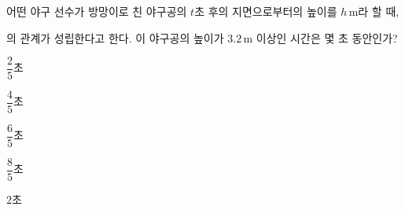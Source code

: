 \hspace*{2mm}\begin{minipage}[t]{\dimexpr\linewidth-2mm\relax}\vspace{0pt}
어떤 야구 선수가 방망이로 친 야구공의 $t$초 후의 지면으로부터의 높이를 $h\,\mathrm{m}$라 할 때,\par\smallskip{}\par\smallskip\noindent 의 관계가 성립한다고 한다. 이 야구공의 높이가 $3.2\,\mathrm{m}$ 이상인 시간은 몇 초 동안인가?
\begin{choices32}{\rule[-3ex]{0pt}{8ex}$\dfrac{2}{5}$초}{\rule[-3ex]{0pt}{8ex}$\dfrac{4}{5}$초}{\rule[-3ex]{0pt}{8ex}$\dfrac{6}{5}$초}{\rule[-3ex]{0pt}{8ex}$\dfrac{8}{5}$초}{\rule[-3ex]{0pt}{8ex}$2$초}\end{choices32}\end{minipage}
